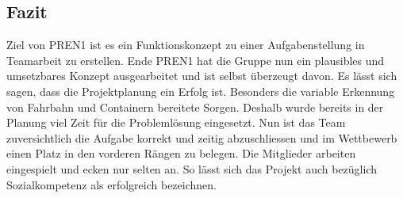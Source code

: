 \subsection{Fazit}

Ziel von PREN1 ist es ein Funktionskonzept zu einer Aufgabenstellung in Teamarbeit zu erstellen. Ende PREN1 hat die Gruppe nun ein plausibles und umsetzbares Konzept ausgearbeitet und ist selbst überzeugt davon. Es lässt sich sagen, dass die Projektplanung ein Erfolg ist. Besonders die variable Erkennung von Fahrbahn und Containern bereitete Sorgen. Deshalb wurde bereits in der Planung viel Zeit für die Problemlösung eingesetzt. Nun ist das Team zuversichtlich die Aufgabe korrekt und zeitig abzuschliessen und im Wettbewerb einen Platz in den vorderen Rängen zu belegen. Die Mitglieder arbeiten eingespielt und ecken nur selten an. So lässt sich das Projekt auch bezüglich Sozialkompetenz als erfolgreich bezeichnen. 




